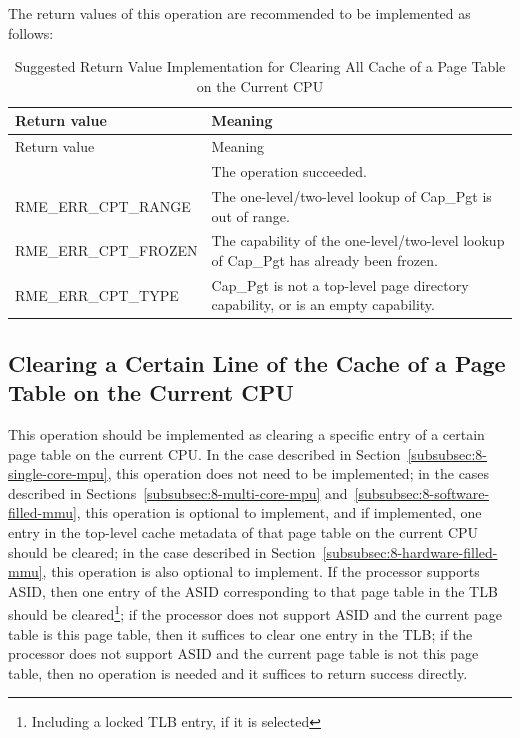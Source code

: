 The return values of this operation are recommended to be implemented as follows:

\begin{xltabular}{\textwidth}{@{}>{\hsize\raggedright\arraybackslash}X>{\hsize\raggedright\arraybackslash}X@{}}
\caption{Suggested Return Value Implementation for Clearing All Cache of a Page Table on the Current CPU}\label{tab:8-6-clear-all-page-table-cache-suggested-return-values}\\
\toprule
Return value & Meaning\tabularnewline
\endfirsthead
\toprule
Return value & Meaning\tabularnewline
\midrule
\endhead
\bottomrule
{} & The operation succeeded.\tabularnewline
    RME\_ERR\_CPT\_RANGE & The one-level/two-level lookup of Cap\_Pgt is out of range.\tabularnewline
    RME\_ERR\_CPT\_FROZEN & The capability of the one-level/two-level lookup of Cap\_Pgt has already been frozen.\tabularnewline
    RME\_ERR\_CPT\_TYPE & Cap\_Pgt is not a top-level page directory capability, or is an empty capability.\tabularnewline
\end{xltabular}
\nopagebreak[4]

\subsection{Clearing a Certain Line of the Cache of a Page Table on the Current CPU}\label{subsec:8-clear-page-table-cache-line}

This operation should be implemented as clearing a specific entry of a certain page table on the current CPU. In the case described in Section~\ref{subsubsec:8-single-core-mpu}, this operation does not need to be implemented; in the cases described in Sections~\ref{subsubsec:8-multi-core-mpu} and~\ref{subsubsec:8-software-filled-mmu}, this operation is optional to implement, and if implemented, one entry in the top-level cache metadata of that page table on the current CPU should be cleared; in the case described in Section~\ref{subsubsec:8-hardware-filled-mmu}, this operation is also optional to implement. If the processor supports ASID, then one entry of the ASID corresponding to that page table in the TLB should be cleared\footnote{Including a locked TLB entry, if it is selected}; if the processor does not support ASID and the current page table is this page table, then it suffices to clear one entry in the TLB; if the processor does not support ASID and the current page table is not this page table, then no operation is needed and it suffices to return success directly.

